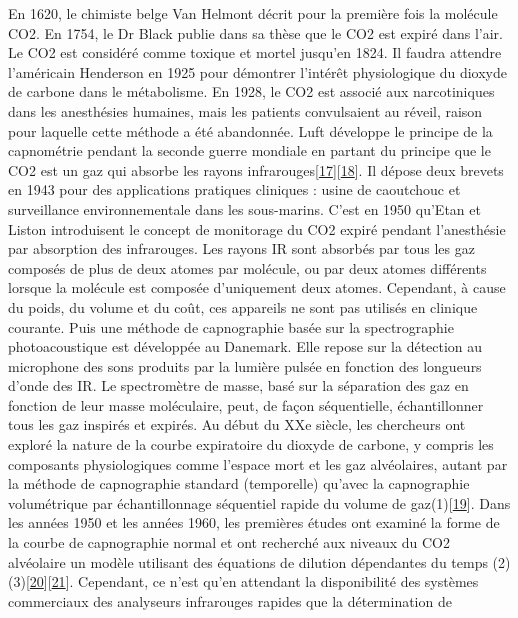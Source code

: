 \documentclass[12pt,]{article}
\begin{document}
En 1620, le chimiste belge Van Helmont décrit pour la première fois la
molécule CO2. En 1754, le Dr Black publie dans sa thèse que le CO2 est
expiré dans l'air. Le CO2 est considéré comme toxique et mortel jusqu'en
1824. Il faudra attendre l'américain Henderson en 1925 pour démontrer
l'intérêt physiologique du dioxyde de carbone dans le métabolisme. En
1928, le CO2 est associé aux narcotiniques dans les anesthésies
humaines, mais les patients convulsaient au réveil, raison pour laquelle
cette méthode a été abandonnée. Luft développe le principe de la
capnométrie pendant la seconde guerre mondiale en partant du principe
que le CO2 est un gaz qui absorbe les rayons
infrarouges{[}\protect\hyperlink{ref-luft1943neue}{17}{]}{[}\protect\hyperlink{ref-bhavani1992capnometry}{18}{]}.
Il dépose deux brevets en 1943 pour des applications pratiques cliniques
: usine de caoutchouc et surveillance environnementale dans les
sous-marins. C'est en 1950 qu'Etan et Liston introduisent le concept de
monitorage du CO2 expiré pendant l'anesthésie par absorption des
infrarouges. Les rayons IR sont absorbés par tous les gaz composés de
plus de deux atomes par molécule, ou par deux atomes différents lorsque
la molécule est composée d'uniquement deux atomes. Cependant, à cause du
poids, du volume et du coût, ces appareils ne sont pas utilisés en
clinique courante. Puis une méthode de capnographie basée sur la
spectrographie photoacoustique est développée au Danemark. Elle repose
sur la détection au microphone des sons produits par la lumière pulsée
en fonction des longueurs d'onde des IR. Le spectromètre de masse, basé
sur la séparation des gaz en fonction de leur masse moléculaire, peut,
de façon séquentielle, échantillonner tous les gaz inspirés et expirés.
Au début du XXe siècle, les chercheurs ont exploré la nature de la
courbe expiratoire du dioxyde de carbone, y compris les composants
physiologiques comme l'espace mort et les gaz alvéolaires, autant par la
méthode de capnographie standard (temporelle) qu'avec la capnographie
volumétrique par échantillonnage séquentiel rapide du volume de
gaz(1){[}\protect\hyperlink{ref-aitken1928fluctuation}{19}{]}. Dans les
années 1950 et les années 1960, les premières études ont examiné la
forme de la courbe de capnographie normal et ont recherché aux niveaux
du CO2 alvéolaire un modèle utilisant des équations de dilution
dépendantes du temps
(2)(3){[}\protect\hyperlink{ref-chilton1952mathematical}{20}{]}{[}\protect\hyperlink{ref-yamamoto1960mathematical}{21}{]}.
Cependant, ce n'est qu'en attendant la disponibilité des systèmes
commerciaux des analyseurs infrarouges rapides que la détermination de
\end{document}
